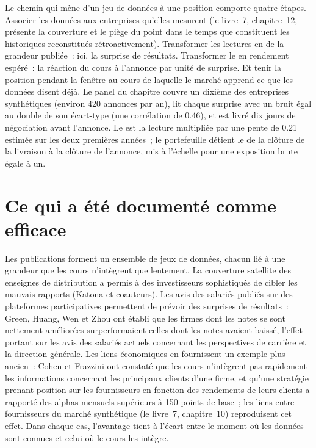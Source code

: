 Le chemin qui mène d'un jeu de données à une position comporte quatre étapes. Associer les données aux entreprises qu'elles mesurent (le livre~7, chapitre~12, présente la couverture et le
piège du point dans le temps que constituent les historiques reconstitués rétroactivement). Transformer les lectures en  de la grandeur publiée~: ici, la surprise de résultats. Transformer le  en
rendement espéré~: la réaction du cours à l'annonce par unité de surprise. Et tenir la position pendant la fenêtre au cours de laquelle le marché apprend ce que les données
disent déjà. Le panel du chapitre couvre un dixième des entreprises synthétiques (environ 420 annonces par an), lit chaque surprise avec un bruit égal au double de son écart-type (une
corrélation de 0.46), et est livré dix jours de négociation avant l'annonce. Le  est la lecture multipliée par une pente de 0.21 estimée sur les deux premières
années~; le portefeuille détient le  de la clôture de la livraison à la clôture de l'annonce, mis à l'échelle pour une exposition brute égale à un.

\section{Ce qui a été documenté comme efficace}

Les publications forment un ensemble de jeux de données, chacun lié à une grandeur que les cours n'intègrent que lentement. La couverture satellite des enseignes de distribution a permis à des investisseurs sophistiqués
de cibler les mauvais rapports (Katona et coauteurs). Les avis des salariés publiés sur des plateformes participatives permettent de prévoir des surprises de résultats~: Green, Huang, Wen et Zhou ont établi que les firmes dont
les notes se sont nettement améliorées surperformaient celles dont les notes avaient baissé, l'effet portant sur les avis des salariés actuels concernant les perspectives de carrière et la
direction générale. Les liens économiques en fournissent un exemple plus ancien~: Cohen et Frazzini ont constaté que les cours n'intègrent pas rapidement les informations concernant les principaux clients d'une firme,
et qu'une stratégie prenant position sur les fournisseurs en fonction des rendements de leurs clients a rapporté des alphas mensuels supérieurs à 150 points de base~; les liens entre fournisseurs du marché synthétique
(le livre~7, chapitre~10) reproduisent cet effet. Dans chaque cas, l'avantage tient à l'écart entre le moment où les données sont connues et celui où le cours les intègre.

